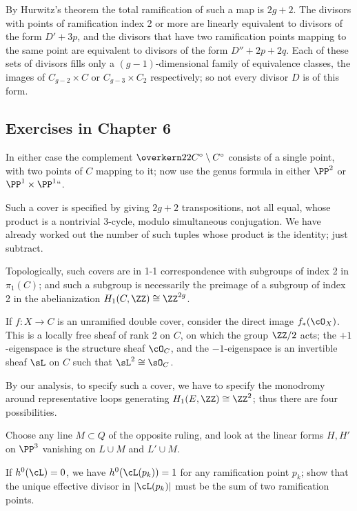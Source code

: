 By
Hurwitz's theorem
%
the total ramification of such a map is $2g+2$. The divisors with points of ramification
index 2 or more are linearly equivalent to divisors of the form $D'+3p$, and the divisors that have two ramification
points mapping to the same point are equivalent to divisors of the form $D''+2p+2q$. Each of these sets
of divisors fills only a
$(g{-}1)$-dimensional family of equivalence classes, the images of
$C_{g-2}\times C$ or $C_{g-3}\times C_2$ respectively; so not every divisor $D$ is of this form.

\subsection*{Exercises in Chapter 6\nopunct}

 In either case the complement $\overkern22{C^\circ}
  \setminus C^\circ$ consists of a single point, with two points of $C$
  mapping to it; now use the genus formula in either $\PP^2$ or $\PP^1
  \times \PP^1` `$.

Such a cover is specified by giving $2g+2$ transpositions, not
all equal, whose product is a nontrivial 3-cycle, modulo simultaneous
conjugation. We have already worked out the number of such tuples whose
product is the identity; just subtract.

 Topologically, such covers are in 1-1 correspondence with
subgroups of index 2 in $\pi_1(C)$; and such a subgroup is necessarily
the preimage of a subgroup of index 2 in the abelianization $H_1(C, \ZZ)
\cong \ZZ^{2g}$.

If $f : X \to C$ is an unramified double cover, consider the direct
image $f_*(\cO_X)$. This is a locally free sheaf of rank 2 on $C$,
on which the group $\ZZ/2$ acts; the $+1$-eigenspace is the structure
sheaf $\cO_C$, and the $-1$-eigenspace is an invertible sheaf $\sL$
on $C$ such that $\sL^2 \cong \sO_C$.

By our analysis, to specify such a cover, we have to specify the
monodromy around representative loops generating $H_1(E, \ZZ) \cong\ZZ^2$;
thus there are four possibilities.

Choose any line $M \subset Q$ of the opposite ruling, and look at the
linear forms $H, H'$ on $\PP^3$ vanishing on $L \cup M$ and $L' \cup M$.

 If $h^0(\cL) = 0$,
we have $h^0(\cL(p_k)) = 1$ for any ramification point $p_k$;
show that  the unique effective divisor in
 $|\cL(p_k)|$ must be the sum of two ramification points.


